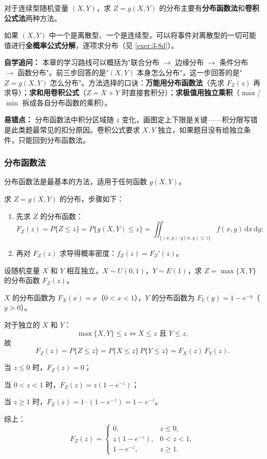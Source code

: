 ﻿\documentclass[lang=cn,11pt]{elegantbook}
\begin{document}
对于连续型随机变量 $(X,Y)$，求 $Z = g(X,Y)$ 的分布主要有\textbf{分布函数法}和\textbf{卷积公式法}两种方法。

如果 $(X,Y)$ 中一个是离散型、一个是连续型，可以将事件对离散型的一切可能值进行\textbf{全概率公式分解}，逐项求分布（见 \ref{exer:3-8d}）。

\begin{note}
\textbf{自学追问：} 本章的学习路线可以概括为"联合分布 $\to$ 边缘分布 $\to$ 条件分布 $\to$ 函数分布"。前三步回答的是"$(X,Y)$ 本身怎么分布"，这一步回答的是"$Z=g(X,Y)$ 怎么分布"。方法选择的口诀：\textbf{万能用分布函数法}（先求 $F_Z(z)$ 再求导）；\textbf{求和用卷积公式}（$Z=X+Y$ 时直接套积分）；\textbf{求极值用独立乘积}（$\max$/$\min$ 拆成各自分布函数的乘积）。

\textbf{易错点：} 分布函数法中积分区域随 $z$ 变化，画图定上下限是关键——积分限写错是此类题最常见的扣分原因。卷积公式要求 $X,Y$ 独立，如果题目没有给独立条件，只能回到分布函数法。
\end{note}

\subsubsection{分布函数法}

分布函数法是最基本的方法，适用于任何函数 $g(X,Y)$。

\begin{property}[分布函数法]\label{prop:df-method}
求 $Z = g(X,Y)$ 的分布，步骤如下：
\begin{enumerate}
    \item 先求 $Z$ 的分布函数：
    \[
    F_Z(z) = P\{Z \leqslant z\} = P\{g(X,Y) \leqslant z\} = \iint_{\{(x,y): g(x,y) \leqslant z\}}f(x,y)\,\mathrm{d}x\,\mathrm{d}y;
    \]
    \item 再对 $F_Z(z)$ 求导得概率密度：$f_Z(z) = F_Z'(z)$。
\end{enumerate}
\end{property}

\begin{exercise}\label{exer:3-7}
设随机变量 $X$ 和 $Y$ 相互独立，$X \sim U(0, 1)$，$Y \sim E(1)$，求 $Z = \max\{X, Y\}$ 的分布函数 $F_Z(z)$。
\end{exercise}

\begin{solution}
$X$ 的分布函数为 $F_X(x) = x$（$0 < x < 1$），$Y$ 的分布函数为 $F_Y(y) = 1 - e^{-y}$（$y > 0$）。

对于独立的 $X$ 和 $Y$：
\[
\max\{X, Y\} \leqslant z \iff X \leqslant z \text{ 且 } Y \leqslant z,
\]
故
\[
F_Z(z) = P\{Z \leqslant z\} = P\{X \leqslant z\}\,P\{Y \leqslant z\} = F_X(z)\,F_Y(z).
\]

当 $z \leqslant 0$ 时，$F_Z(z) = 0$；

当 $0 < z < 1$ 时，$F_Z(z) = z(1 - e^{-z})$；

当 $z \geqslant 1$ 时，$F_Z(z) = 1 \cdot (1-e^{-z}) = 1 - e^{-z}$。

综上：
\[
F_Z(z) = \begin{cases} 0, & z \leqslant 0, \\ z(1 - e^{-z}), & 0 < z < 1, \\ 1 - e^{-z}, & z \geqslant 1. \end{cases}
\]
\end{solution}
\end{document}
